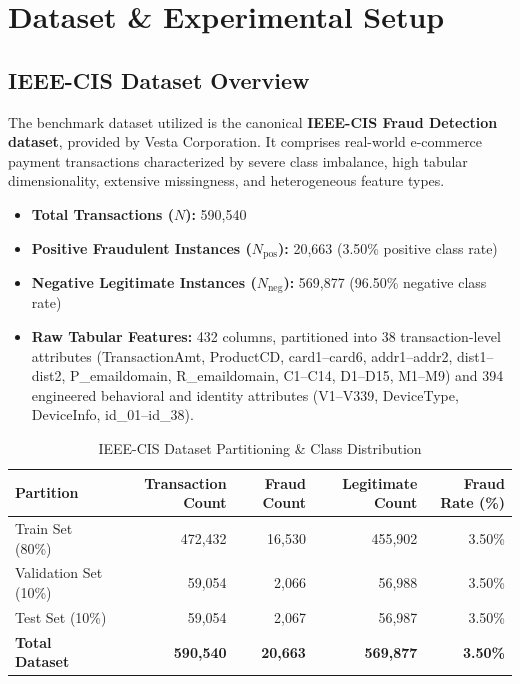 \documentclass[11pt,a4paper]{report}
\begin{document}
\newpage
\section{Dataset \& Experimental Setup}

\subsection{IEEE-CIS Dataset Overview}
The benchmark dataset utilized is the canonical \textbf{IEEE-CIS Fraud Detection dataset}, provided by Vesta Corporation. It comprises real-world e-commerce payment transactions characterized by severe class imbalance, high tabular dimensionality, extensive missingness, and heterogeneous feature types.
\begin{itemize}
    \item \textbf{Total Transactions ($N$):} 590,540
    \item \textbf{Positive Fraudulent Instances ($N_{\text{pos}}$):} 20,663 (3.50\% positive class rate)
    \item \textbf{Negative Legitimate Instances ($N_{\text{neg}}$):} 569,877 (96.50\% negative class rate)
    \item \textbf{Raw Tabular Features:} 432 columns, partitioned into 38 transaction-level attributes (TransactionAmt, ProductCD, card1--card6, addr1--addr2, dist1--dist2, P\_emaildomain, R\_emaildomain, C1--C14, D1--D15, M1--M9) and 394 engineered behavioral and identity attributes (V1--V339, DeviceType, DeviceInfo, id\_01--id\_38).
\end{itemize}

\begin{table}[H]
\centering
\caption{IEEE-CIS Dataset Partitioning \& Class Distribution}
\label{tab:dataset_split}
\begin{tabular}{lrrrr}
\toprule
\textbf{Partition} & \textbf{Transaction Count} & \textbf{Fraud Count} & \textbf{Legitimate Count} & \textbf{Fraud Rate (\%)} \\
\midrule
Train Set (80\%) & 472,432 & 16,530 & 455,902 & 3.50\% \\
Validation Set (10\%) & 59,054 & 2,066 & 56,988 & 3.50\% \\
Test Set (10\%) & 59,054 & 2,067 & 56,987 & 3.50\% \\
\midrule
\textbf{Total Dataset} & \textbf{590,540} & \textbf{20,663} & \textbf{569,877} & \textbf{3.50\%} \\
\bottomrule
\end{tabular}
\end{table}
\end{document}

